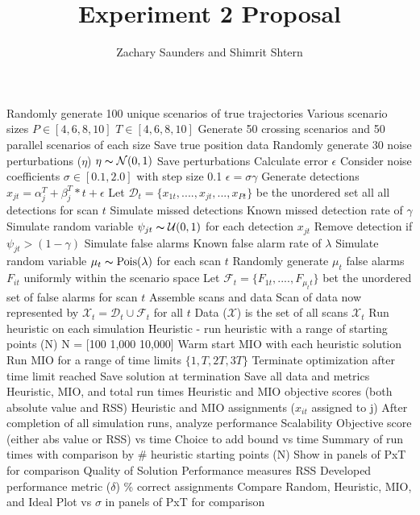\documentclass[11pt, oneside]{article}   	%
\title{Experiment 2 Proposal}
\author{Zachary Saunders and Shimrit Shtern}
\begin{document}
\maketitle
\begin{outline}[enumerate]
 	\1 Randomly generate 100 unique scenarios of true trajectories
		\2 Various scenario sizes
			\3 $P \in [4, 6, 8, 10]$
			\3 $T \in [4, 6, 8, 10]$
		\2 Generate 50 crossing scenarios and 50 parallel scenarios of each size
		\2 Save true position data
	\1 Randomly generate 30 noise perturbations ($\eta$)
		\2 $\eta \thicksim \mathcal{N}(0,1)$
		\2 Save perturbations
	\1 Calculate error $\epsilon$
		\2 Consider noise coefficients $\sigma \in [0.1, 2.0]$ with step size 0.1
		\2 $\epsilon = \sigma\gamma$
	\1 Generate detections
		\2 $x_{jt} = \alpha^{T}_{j} + \beta^{T}_{j}*t+\epsilon$
		\2 Let $\mathcal{D}_{t} = \{x_{1t},...., x_{jt},...,x_{Pt}\}$ be the unordered set all all detections for scan $t$
	\1 Simulate missed detections 
		\2 Known missed detection rate of $\gamma$
		\2 Simulate random variable $\psi_{jt} \thicksim \mathcal{U}(0, 1)$ for each detection $x_{jt}$
		\2 Remove detection if $\psi_{jt} > (1 - \gamma)$
	\1 Simulate false alarms
		\2 Known false alarm rate of $\lambda$
		\2 Simulate random variable $\mu_{t} \thicksim \text{Pois}(\lambda)$ for each scan $t$
		\2 Randomly generate $\mu_{t}$ false alarms $F_{it}$ uniformly within the scenario space
		\2 Let $\mathcal{F}_{t} = \{F_{1t}, ...., F_{\mu_{t}t}\}$ bet the unordered set of false alarms for scan $t$
	\1 Assemble scans and data
		\2 Scan of data now represented by $\mathcal{X}_{t} = \mathcal{D}_{t} \cup \mathcal{F}_{t}$ for all $t$
		\2 Data ($\boldsymbol{\mathcal{X}}$) is the set of all scans $\mathcal{X}_{t}$ 
	\1 Run heuristic on each simulation
		\2 Heuristic - run heuristic with a range of starting points (N) 	
		\2 N = [100 1,000 10,000]
	\1 Warm start MIO with each heuristic solution
		\2 Run MIO for a range of time limits $\{1, T, 2T, 3T\}$
		\2 Terminate optimization after time limit reached
		\2 Save solution at termination
	\1 Save all data and metrics
		\2 Heuristic, MIO, and total run times
		\2 Heuristic and MIO objective scores (both absolute value and RSS)
		\2 Heuristic and MIO assignments ($x_{it}$ assigned to j)
	\1 After completion of all simulation runs, analyze performance
		\2 Scalability
			\3 Objective score (either abs value or RSS) vs time 
			\3 Choice to add bound vs time 
			\3 Summary of run times with comparison by \# heuristic starting points (N)
			\3 Show in panels of PxT for comparison
		\2 Quality of Solution
			\3 Performance measures
				\4 RSS
				\4 Developed performance metric ($\delta$)
				\4 \% correct assignments
			\3 Compare Random, Heuristic, MIO, and Ideal
			\3 Plot vs $\sigma$ in panels of PxT for comparison

\end{outline}
\end{document}
